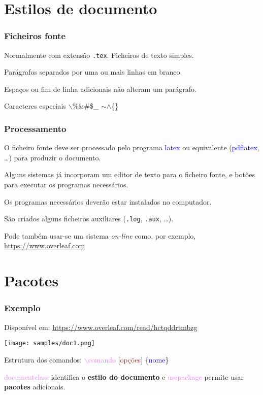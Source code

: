 \documentclass{beamer}
\begin{document}
\section{Estilos de documento}
\begin{frame}
  \frametitle{Ficheiros fonte}
  Normalmente com extensão \texttt{.tex}. Ficheiros de texto simples.\pause
    
  Parágrafos separados por uma ou mais linhas em branco.\pause

  Espaços ou fim de linha adicionais não alteram um parágrafo.\pause

  \vspace*{12pt}
  \begin{block}{Caracteres especiais}
    \qquad$\backslash$\quad \%\quad \&\quad \#\quad \$\quad \_\quad
    $\sim$\quad $\wedge$\quad \{\quad \}\quad [\quad ]
  \end{block}
\end{frame}
\begin{frame}
  \frametitle{Processamento}
  O ficheiro fonte deve ser processado pelo programa
  \textcolor{blue}{latex} ou equivalente (\textcolor{blue}{pdflatex},
  \ldots) para produzir o documento.\pause

  Alguns sistemas já incorporam um editor de texto para o ficheiro fonte,
  e botões para executar os programas necessários.\pause

  Os programas necessários deverão estar instalados no
  computador.\pause

  São criados alguns ficheiros auxiliares (\texttt{.log},
  \texttt{.aux}, \ldots).\pause
  
  Pode também usar-se um sistema \emph{on-line} como, por exemplo,
  \url{https://www.overleaf.com}
\end{frame}
\section{Pacotes}
\begin{frame}
  \frametitle{Exemplo}
  Disponível em: \url{https://www.overleaf.com/read/hctqddrtmbzg}
  
  \begin{center}
    \texttt{[image: samples/doc1.png]}
  \end{center}

  Estrutura dos comandos: \textcolor{violet}{$\backslash$comando} [\textcolor{brown}{opções}] \{\textcolor{blue}{nome}\}
  
  \textcolor{violet}{documentclass} identifica o \textbf{estilo
    do documento} e \textcolor{violet}{usepackage} permite usar
  \textbf{pacotes} adicionais.
\end{frame}
\end{document}
